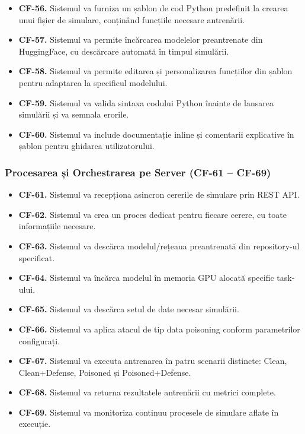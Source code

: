 \documentclass[../../main.tex]{subfiles}
\begin{document}
        \begin{itemize}
            \item \textbf{CF-56.} Sistemul va furniza un șablon de cod Python predefinit la crearea unui fișier de simulare, conținând funcțiile necesare antrenării.
            \item \textbf{CF-57.} Sistemul va permite încărcarea modelelor preantrenate din HuggingFace, cu descărcare automată în timpul simulării.
            \item \textbf{CF-58.} Sistemul va permite editarea și personalizarea funcțiilor din șablon pentru adaptarea la specificul modelului.
            \item \textbf{CF-59.} Sistemul va valida sintaxa codului Python înainte de lansarea simulării și va semnala erorile.
            \item \textbf{CF-60.} Sistemul va include documentație inline și comentarii explicative în șablon pentru ghidarea utilizatorului.
        \end{itemize}

        \subsubsection{Procesarea și Orchestrarea pe Server (CF-61 -- CF-69)}

        \begin{itemize}
            \item \textbf{CF-61.} Sistemul va recepționa asincron cererile de simulare prin REST API.
            \item \textbf{CF-62.} Sistemul va crea un proces dedicat pentru fiecare cerere, cu toate informațiile necesare.
            \item \textbf{CF-63.} Sistemul va descărca modelul/rețeaua preantrenată din repository-ul specificat.
            \item \textbf{CF-64.} Sistemul va încărca modelul în memoria GPU alocată specific task-ului.
            \item \textbf{CF-65.} Sistemul va descărca setul de date necesar simulării.
            \item \textbf{CF-66.} Sistemul va aplica atacul de tip data poisoning conform parametrilor configurați.
            \item \textbf{CF-67.} Sistemul va executa antrenarea în patru scenarii distincte: Clean, Clean+Defense, Poisoned și Poisoned+Defense.
            \item \textbf{CF-68.} Sistemul va returna rezultatele antrenării cu metrici complete.
            \item \textbf{CF-69.} Sistemul va monitoriza continuu procesele de simulare aflate în execuție.
        \end{itemize}
\end{document}
